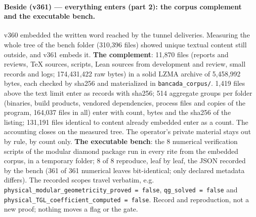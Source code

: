 \documentclass[11pt]{article}
\theoremstyle{definition}\newtheorem{deriv}{Derivation}
\begin{document}
\paragraph*{Beside (v361) --- everything enters (part 2): the corpus complement and the executable bench.} v360 embedded the written word reached by the tunnel deliveries. Measuring the whole tree of the bench folder (310,396 files) showed unique textual content still outside, and v361 embeds it. \textbf{The complement}: 11,870 files (reports and reviews, TeX sources, scripts, Lean sources from development and review, small records and logs; 174,431,422 raw bytes) in a solid LZMA archive of 5,458,992 bytes, each checked by sha256 and materialized in \texttt{bancada\_corpus/}. 1,419 files above the text limit enter as records with sha256; 514 aggregate groups per folder (binaries, build products, vendored dependencies, process files and copies of the program, 164,037 files in all) enter with count, bytes and the sha256 of the listing; 131,191 files identical to content already embedded enter as a count. The accounting closes on the measured tree. The operator's private material stays out by rule, by count only. \textbf{The executable bench}: the 8 numerical verification scripts of the modular diamond package run in every rite from the embedded corpus, in a temporary folder; 8 of 8 reproduce, leaf by leaf, the JSON recorded by the bench (361 of 361 numerical leaves bit-identical; only declared metadata differs). The recorded scopes travel verbatim, e.g. \texttt{physical\_modular\_geometricity\_proved = false}, \texttt{qg\_solved = false} and \texttt{physical\_TGL\_coefficient\_computed = false}. Record and reproduction, not a new proof; nothing moves a flag or the gate.
\end{document}
